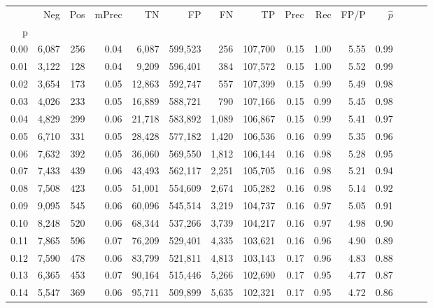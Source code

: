 \begin{tabular}{rrrrrrrrrrrrrrr}
\toprule
{} &     Neg &    Pos & mPrec &       TN &       FP &       FN &       TP &  Prec &   Rec &  FP/P & $\hat{p}$ \\
p    &         &        &       &          &          &          &          &       &       &       &           \\
\midrule
0.00 &   6,087 &    256 &  0.04 &    6,087 &  599,523 &      256 &  107,700 &  0.15 &  1.00 &  5.55 &      0.99 \\
0.01 &   3,122 &    128 &  0.04 &    9,209 &  596,401 &      384 &  107,572 &  0.15 &  1.00 &  5.52 &      0.99 \\
0.02 &   3,654 &    173 &  0.05 &   12,863 &  592,747 &      557 &  107,399 &  0.15 &  0.99 &  5.49 &      0.98 \\
0.03 &   4,026 &    233 &  0.05 &   16,889 &  588,721 &      790 &  107,166 &  0.15 &  0.99 &  5.45 &      0.98 \\
0.04 &   4,829 &    299 &  0.06 &   21,718 &  583,892 &    1,089 &  106,867 &  0.15 &  0.99 &  5.41 &      0.97 \\
0.05 &   6,710 &    331 &  0.05 &   28,428 &  577,182 &    1,420 &  106,536 &  0.16 &  0.99 &  5.35 &      0.96 \\
0.06 &   7,632 &    392 &  0.05 &   36,060 &  569,550 &    1,812 &  106,144 &  0.16 &  0.98 &  5.28 &      0.95 \\
0.07 &   7,433 &    439 &  0.06 &   43,493 &  562,117 &    2,251 &  105,705 &  0.16 &  0.98 &  5.21 &      0.94 \\
0.08 &   7,508 &    423 &  0.05 &   51,001 &  554,609 &    2,674 &  105,282 &  0.16 &  0.98 &  5.14 &      0.92 \\
0.09 &   9,095 &    545 &  0.06 &   60,096 &  545,514 &    3,219 &  104,737 &  0.16 &  0.97 &  5.05 &      0.91 \\
0.10 &   8,248 &    520 &  0.06 &   68,344 &  537,266 &    3,739 &  104,217 &  0.16 &  0.97 &  4.98 &      0.90 \\
0.11 &   7,865 &    596 &  0.07 &   76,209 &  529,401 &    4,335 &  103,621 &  0.16 &  0.96 &  4.90 &      0.89 \\
0.12 &   7,590 &    478 &  0.06 &   83,799 &  521,811 &    4,813 &  103,143 &  0.17 &  0.96 &  4.83 &      0.88 \\
0.13 &   6,365 &    453 &  0.07 &   90,164 &  515,446 &    5,266 &  102,690 &  0.17 &  0.95 &  4.77 &      0.87 \\
0.14 &   5,547 &    369 &  0.06 &   95,711 &  509,899 &    5,635 &  102,321 &  0.17 &  0.95 &  4.72 &      0.86 \\

\end{tabular}

